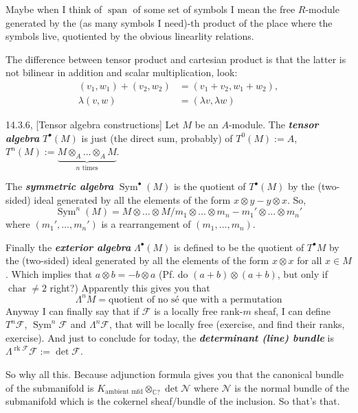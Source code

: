 \begin{remark}\leavevmode
Maybe when I think of \(\operatorname{span}\) of some set of symbols I mean the free \(R\)-module generated by the (as many symbols I need)-th product of the place where the symbols live, quotiented by the obvious linearlity relations.
\end{remark}

\begin{remark}\leavevmode
The difference between tensor product and cartesian product is that the latter is not bilinear in addition and scalar multiplication, look:
\begin{align*}
	(v_1,w_1)+(v_2,w_2)&=(v_1+v_2,w_1+w_2),\\
	\lambda(v,w)&=(\lambda v, \lambda w)
\end{align*}
\end{remark}

\begin{thing6}{14.3.6, \cite{sea}}[Tensor algebra constructions]\leavevmode
Let \(M\) be an \(A\)-module. The \textit{\textbf{tensor algebra}} \(T^\bullet(M)\) is just (the direct sum, probably) of \(T^0(M):=A\), \(T^n(M):=\underbrace{M\otimes_A \ldots\otimes_A M}_{n\text{ times} }\).

The \textit{\textbf{symmetric algebra}} \(\operatorname{Sym}^\bullet(M)\) is the quotient of \(T^\bullet (M)\) by the (two-sided) ideal generated by all the elements of the form \(x \otimes y -y \otimes x\). So,
\[\operatorname{Sym}^n(M)=M \otimes \ldots \otimes M \Big/m_1 \otimes \ldots \otimes m_n - m_1' \otimes \ldots \otimes m_n'\]
where \((m_1',\ldots,m_n')\) is a rearrangement of \((m_1,\ldots,m_n)\).

Finally the \textit{\textbf{exterior algebra}} \(\Lambda^{\bullet}(M)\) is defined to be the quotient of \(T^\bullet M\) by the (two-sided) ideal generated by all the elements of the form \(x \otimes x\) for all \(x \in M\). Which implies that \(a \otimes b = -b \otimes a\) (Pf. do \((a+b) \otimes (a+b)\), but only if \(\operatorname{char}\neq 2\) right?) Apparently this gives you that
\[\Lambda^{n}M=\text{quotient of no sé que with a permutation} \]
Anyway I can finally say that if \(\mathcal{F}\) is a locally free rank-\(m\) sheaf, I can define \(T^n \mathcal{F}\), \(\operatorname{Sym}^n\mathcal{F}\) and \(\Lambda^{n}\mathcal{F}\), that will be locally free (exercise, and find their ranks, exercise). And just to conclude for today, the \textit{\textbf{determinant (line) bundle}} is  \(\Lambda^{\operatorname{rk}\mathcal{F}}\mathcal{F}:=\det\mathcal{F}\).
\end{thing6}
So why all this. Because adjunction formula gives you that the canonical bundle of the submanifold is \(K_{\text{ambient mfd}}\otimes_{\mathbb{C}?} \det \mathcal{N}\) where \(\mathcal{N}\) is the normal bundle of the submanifold which is the cokernel sheaf/bundle of the inclusion. So that's that.

